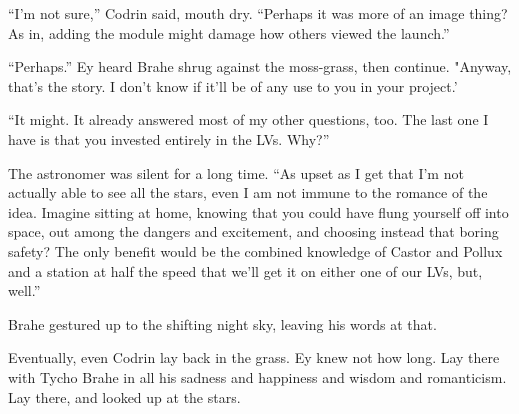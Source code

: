 ``I'm not sure,'' Codrin said, mouth dry. ``Perhaps it was more of an image thing? As in, adding the module might damage how others viewed the launch.''

``Perhaps.'' Ey heard Brahe shrug against the moss-grass, then continue. "Anyway, that's the story. I don't know if it'll be of any use to you in your project.'

``It might. It already answered most of my other questions, too. The last one I have is that you invested entirely in the LVs. Why?''

The astronomer was silent for a long time. ``As upset as I get that I'm not actually able to see all the stars, even I am not immune to the romance of the idea. Imagine sitting at home, knowing that you could have flung yourself off into space, out among the dangers and excitement, and choosing instead that boring safety? The only benefit would be the combined knowledge of Castor and Pollux and a station at half the speed that we'll get it on either one of our LVs, but, well.''

Brahe gestured up to the shifting night sky, leaving his words at that.

Eventually, even Codrin lay back in the grass. Ey knew not how long. Lay there with Tycho Brahe in all his sadness and happiness and wisdom and romanticism. Lay there, and looked up at the stars.
